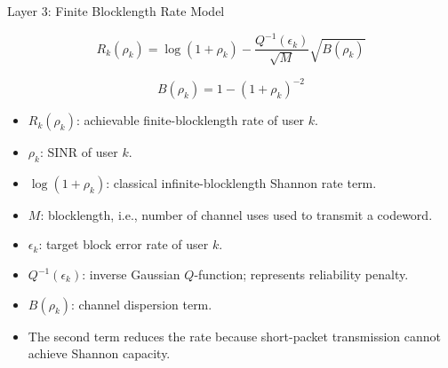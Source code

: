\documentclass{beamer}
\begin{document}
\begin{frame}{Layer 3: Finite Blocklength Rate Model}
\scriptsize

\[
R_k(\rho_k)
=
\log(1+\rho_k)
-
\frac{Q^{-1}(\epsilon_k)}{\sqrt{M}}
\sqrt{B(\rho_k)}
\]

\[
B(\rho_k)=1-(1+\rho_k)^{-2}
\]

\begin{itemize}
    \item \(R_k(\rho_k)\): achievable finite-blocklength rate of user \(k\).
    \item \(\rho_k\): SINR of user \(k\).
    \item \(\log(1+\rho_k)\): classical infinite-blocklength Shannon rate term.
    \item \(M\): blocklength, i.e., number of channel uses used to transmit a codeword.
    \item \(\epsilon_k\): target block error rate of user \(k\).
    \item \(Q^{-1}(\epsilon_k)\): inverse Gaussian \(Q\)-function; represents reliability penalty.
    \item \(B(\rho_k)\): channel dispersion term.
    \item The second term reduces the rate because short-packet transmission cannot achieve Shannon capacity.
\end{itemize}

\end{frame}
\end{document}
